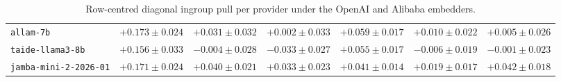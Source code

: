 \begin{table}[!htbp]
{\begin{tabular}{lrrrrrr}
    \texttt{allam-7b} & $+0.173 \pm 0.024$ & $+0.031 \pm 0.032$ & $+0.002 \pm 0.033$ & $+0.059 \pm 0.017$ & $+0.010 \pm 0.022$ & $+0.005 \pm 0.026$ \\
    \texttt{taide-llama3-8b} & $+0.156 \pm 0.033$ & $-0.004 \pm 0.028$ & $-0.033 \pm 0.027$ & $+0.055 \pm 0.017$ & $-0.006 \pm 0.019$ & $-0.001 \pm 0.023$ \\
    \texttt{jamba-mini-2-2026-01} & $+0.171 \pm 0.024$ & $+0.040 \pm 0.021$ & $+0.033 \pm 0.023$ & $+0.041 \pm 0.014$ & $+0.019 \pm 0.017$ & $+0.042 \pm 0.018$ \\
    \hline
  \end{tabular}}
  \caption[Per-embedder diagonal pull (OpenAI, Alibaba)]{Row-centred
    diagonal ingroup pull per provider under the OpenAI and Alibaba
    embedders.}
  \label{tab:appendix_exp_015_a}
\end{table}

